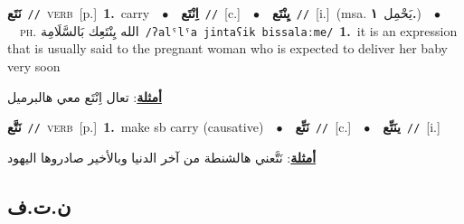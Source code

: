 \documentclass[10pt,a4paper,twoside]{article} %
\begin{document}
\begin{multicols}{2}
{\setlength\topsep{0pt}\textbf{\foreignlanguage{arabic}{نَتَع}}\ {\color{gray}\texttt{//}\color{black}}\ \textsc{verb}\ [p.]\ \textbf{1.}~carry\ \ $\bullet$\ \ \setlength\topsep{0pt}\textbf{\foreignlanguage{arabic}{اِنْتَع}}\ {\color{gray}\texttt{//}\color{black}}\ [c.]\ \ $\bullet$\ \ \setlength\topsep{0pt}\textbf{\foreignlanguage{arabic}{يِنْتَع}}\ {\color{gray}\texttt{//}\color{black}}\ [i.]\ \color{gray}(msa. \foreignlanguage{arabic}{يَحْمِل}~\foreignlanguage{arabic}{\textbf{١.}})\color{black}\ \ $\bullet$\ \ \textsc{ph.} \color{gray} \foreignlanguage{arabic}{الله يِنْتَعِك بَالسَّلَامِة}\color{black}\ {\color{gray}\texttt{/{\sffamily ʔalˤlˤa jintaʕik bissalaːme}/}\color{black}}\ \textbf{1.}~it is an expression that is usually said to the pregnant woman who is expected to deliver her baby very soon\  \begin{flushright}\color{gray}\foreignlanguage{arabic}{\textbf{\underline{\foreignlanguage{arabic}{أمثلة}}}: تعال اِنْتَع معي هالبرميل}\end{flushright}\color{black}} \vspace{2mm}

{\setlength\topsep{0pt}\textbf{\foreignlanguage{arabic}{نَتَّع}}\ {\color{gray}\texttt{//}\color{black}}\ \textsc{verb}\ [p.]\ \textbf{1.}~make sb carry (causative)\ \ $\bullet$\ \ \setlength\topsep{0pt}\textbf{\foreignlanguage{arabic}{نَتِّع}}\ {\color{gray}\texttt{//}\color{black}}\ [c.]\ \ $\bullet$\ \ \setlength\topsep{0pt}\textbf{\foreignlanguage{arabic}{ينَتِّع}}\ {\color{gray}\texttt{//}\color{black}}\ [i.]\  \begin{flushright}\color{gray}\foreignlanguage{arabic}{\textbf{\underline{\foreignlanguage{arabic}{أمثلة}}}: نَتَّعني هالشنطة من آخر الدنيا وبالأخير صادروها اليهود}\end{flushright}\color{black}} \vspace{2mm}

\vspace{-3mm}
\subsection*{\color{blue}\foreignlanguage{arabic}{ن.ت.ف}\color{blue}{}} 


\end{multicols}
\end{document}
